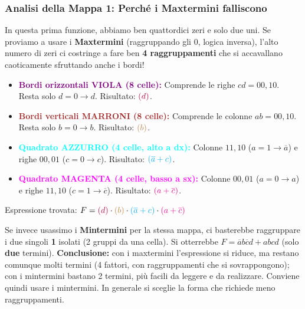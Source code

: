 \subsubsection*{Analisi della Mappa 1: Perché i Maxtermini falliscono}
In questa prima funzione, abbiamo ben quattordici zeri e solo due uni. Se proviamo a usare i \textbf{Maxtermini} (raggruppando gli 0, logica inversa), l'alto numero di zeri ci costringe a fare ben \textbf{4 raggruppamenti} che si accavallano caoticamente sfruttando anche i bordi!
\begin{itemize}
    \item \textcolor{purple}{\textbf{Bordi orizzontali VIOLA (8 celle):}} Comprende le righe $cd=00,10$. Resta solo $d=0 \to d$. Risultato: $\textcolor{purple}{(d)}$.
    \item \textcolor{brown}{\textbf{Bordi verticali MARRONI (8 celle):}} Comprende le colonne $ab=00,10$. Resta solo $b=0 \to b$. Risultato: $\textcolor{brown}{(b)}$.
    \item \textcolor{cyan}{\textbf{Quadrato AZZURRO (4 celle, alto a dx):}} Colonne $11,10$ ($a=1 \to \overline{a}$) e righe $00,01$ ($c=0 \to c$). Risultato: $\textcolor{cyan}{(\overline{a}+c)}$.
    \item \textcolor{magenta}{\textbf{Quadrato MAGENTA (4 celle, basso a sx):}} Colonne $00,01$ ($a=0 \to a$) e righe $11,10$ ($c=1 \to \overline{c}$). Risultato: $\textcolor{magenta}{(a+\overline{c})}$.
\end{itemize}
Espressione trovata: $F = \textcolor{purple}{(d)} \cdot \textcolor{brown}{(b)} \cdot \textcolor{cyan}{(\overline{a}+c)} \cdot \textcolor{magenta}{(a+\overline{c})}$

Se invece usassimo i \textbf{Mintermini} per la stessa mappa, ci basterebbe raggruppare i due singoli \textbf{1} isolati (2 gruppi da una cella). Si otterrebbe $F = \overline{a}b\overline{c}d + abcd$ (solo \textbf{due} termini). \textbf{Conclusione:} con i maxtermini l'espressione si riduce, ma restano comunque molti termini (4 fattori, con raggruppamenti che si sovrappongono); con i mintermini bastano 2 termini, più facili da leggere e da realizzare. Conviene quindi usare i mintermini. In generale si sceglie la forma che richiede meno raggruppamenti.

\vspace{1.5em}

